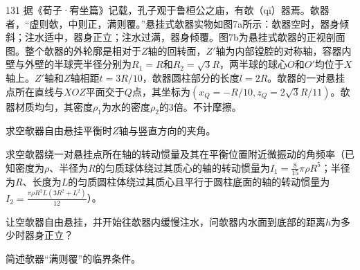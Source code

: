 \begin{problem}[第37届全国中学生物理竞赛决赛][欹器平衡分析]{131}
    据《荀子·宥坐篇》记载，孔子观于鲁桓公之庙，有欹（qī）器焉。欹器者，“虚则欹，中则正，满则覆。”悬挂式欹器实物如图7a所示：欹器空时，器身倾斜；注水适中，器身正立；注水过满，器身倾覆。图7b为悬挂式欹器的正视剖面图。整个欹器的外轮廓是相对于$Z$轴的回转面，$Z'$轴为内部镗腔的对称轴，容器内壁与外壁的半球壳半径分别为$R _ { 1 } = R$和$R _ { 2 } = \sqrt { 3 } R$，两半球的球心$O$和$O'$均位于$X$轴上。$Z'$轴和$Z$轴相距$t = 3 R / 10$，欹器圆柱部分的长度$l = 2 R$。欹器的一对悬挂点所在直线与$XOZ$平面交于$Q$点，其坐标为$( x _ { Q } = - R / 10 , z _ { Q } = 2 \sqrt { 3 } R / 11 )$。欹器材质均匀，其密度$\rho _ { 1 }$为水的密度$\rho _ { 2 }$的3倍。不计摩擦。
    \begin{subproblem}
        求空欹器自由悬挂平衡时$Z$轴与竖直方向的夹角。
    \end{subproblem}
    \begin{subproblem}
        求空欹器绕一对悬挂点所在轴的转动惯量及其在平衡位置附近微振动的角频率（已知密度为$\rho$、半径为$R$的匀质球体绕过其质心的轴的转动惯量为$I _ { 1 } = \frac { 8 } { 1 5 } \pi \rho R ^ { 5 }$；半径为$R$、长度为$L$的匀质圆柱体绕过其质心且平行于圆柱底面的轴的转动惯量为$I _ { 2 } = \frac { \pi \rho R ^ { 2 } L ( 3 R ^ { 2 } + L ^ { 2 } ) } { 1 2 }$）。
    \end{subproblem}
    \begin{subproblem}
        让空欹器自由悬挂，并开始往欹器内缓慢注水，问欹器内水面到底部的距离$h$为多少时器身正立？
    \end{subproblem}
    \begin{subproblem}
        简述欹器“满则覆”的临界条件。
    \end{subproblem}
\end{problem}